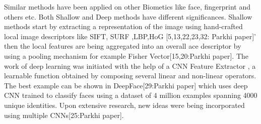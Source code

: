 Similar methods have been applied on other Biometics like face, fingerprint and others etc. Both Shallow and Deep methods have different significances. Shallow methods start by extracting a representation of the image using hand-crafted local image descriptors like SIFT, SURF ,LBP,HoG [5,13,22,23,32: Parkhi paper]' then the local features are being aggregated into an overall ace descriptor by using a pooling mechanism for example Fisher Vector[15,20:Parkhi paper]. The work of deep learning was initiated with the help of a CNN Feature Extractor , a learnable function obtained by composing several linear and non-linear operators. The best example can be shown in DeepFace[29:Parkhi paper] which uses deep CNN trained to classify faces using a dataset of 4 million examples spanning 4000 unique identities. Upon extensive research, new ideas were being incorporated using multiple CNNs[25:Parkhi paper].

